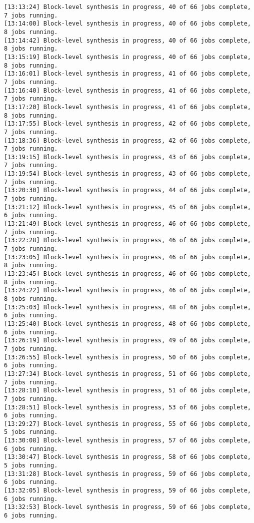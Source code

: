 \begin{lstlisting}[label=func,breaklines=true,breakatwhitespace=false,caption=СОДЕРЖИМОЕ LOG-ФАЙЛА.]
[13:13:24] Block-level synthesis in progress, 40 of 66 jobs complete, 7 jobs running.
[13:14:00] Block-level synthesis in progress, 40 of 66 jobs complete, 8 jobs running.
[13:14:42] Block-level synthesis in progress, 40 of 66 jobs complete, 8 jobs running.
[13:15:19] Block-level synthesis in progress, 40 of 66 jobs complete, 8 jobs running.
[13:16:01] Block-level synthesis in progress, 41 of 66 jobs complete, 7 jobs running.
[13:16:40] Block-level synthesis in progress, 41 of 66 jobs complete, 7 jobs running.
[13:17:20] Block-level synthesis in progress, 41 of 66 jobs complete, 8 jobs running.
[13:17:55] Block-level synthesis in progress, 42 of 66 jobs complete, 7 jobs running.
[13:18:36] Block-level synthesis in progress, 42 of 66 jobs complete, 7 jobs running.
[13:19:15] Block-level synthesis in progress, 43 of 66 jobs complete, 7 jobs running.
[13:19:54] Block-level synthesis in progress, 43 of 66 jobs complete, 7 jobs running.
[13:20:30] Block-level synthesis in progress, 44 of 66 jobs complete, 7 jobs running.
[13:21:12] Block-level synthesis in progress, 45 of 66 jobs complete, 6 jobs running.
[13:21:49] Block-level synthesis in progress, 46 of 66 jobs complete, 7 jobs running.
[13:22:28] Block-level synthesis in progress, 46 of 66 jobs complete, 7 jobs running.
[13:23:05] Block-level synthesis in progress, 46 of 66 jobs complete, 8 jobs running.
[13:23:45] Block-level synthesis in progress, 46 of 66 jobs complete, 8 jobs running.
[13:24:22] Block-level synthesis in progress, 46 of 66 jobs complete, 8 jobs running.
[13:25:03] Block-level synthesis in progress, 48 of 66 jobs complete, 6 jobs running.
[13:25:40] Block-level synthesis in progress, 48 of 66 jobs complete, 6 jobs running.
[13:26:19] Block-level synthesis in progress, 49 of 66 jobs complete, 7 jobs running.
[13:26:55] Block-level synthesis in progress, 50 of 66 jobs complete, 6 jobs running.
[13:27:34] Block-level synthesis in progress, 51 of 66 jobs complete, 7 jobs running.
[13:28:10] Block-level synthesis in progress, 51 of 66 jobs complete, 7 jobs running.
[13:28:51] Block-level synthesis in progress, 53 of 66 jobs complete, 6 jobs running.
[13:29:27] Block-level synthesis in progress, 55 of 66 jobs complete, 5 jobs running.
[13:30:08] Block-level synthesis in progress, 57 of 66 jobs complete, 6 jobs running.
[13:30:47] Block-level synthesis in progress, 58 of 66 jobs complete, 5 jobs running.
[13:31:28] Block-level synthesis in progress, 59 of 66 jobs complete, 6 jobs running.
[13:32:05] Block-level synthesis in progress, 59 of 66 jobs complete, 6 jobs running.
[13:32:53] Block-level synthesis in progress, 59 of 66 jobs complete, 6 jobs running.

\end{lstlisting}
